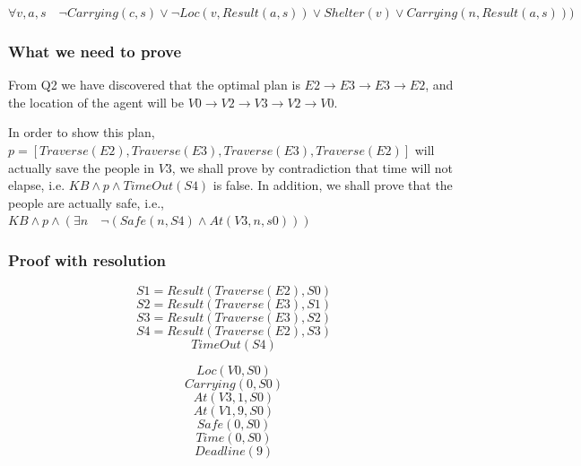 \documentclass{article}                     %
\begin{document}
	\begin{equation}\label{pick_unc}
	 \forall v, a, s \quad \neg Carrying(c, s) \lor \neg Loc(v, Result(a, s)) \lor Shelter(v) \lor Carrying(n, Result(a, s))) 
	\end{equation}
	
	

	
	
	
	
	\subsubsection{What we need to prove}
	From Q2 we have discovered that the optimal plan is $ E2 \rightarrow E3 \rightarrow E3 \rightarrow E2 $, and the location of the agent will be $ V0 \rightarrow V2 \rightarrow V3 \rightarrow V2 \rightarrow V0$.
	
	In order to show this plan, $ p=[Traverse(E2), Traverse(E3), Traverse(E3), Traverse(E2)] $ will actually save the people in $ V3 $, we shall prove by contradiction that time will not elapse, i.e. $ KB \land p \land TimeOut(S4) $ is false. In addition, we shall prove that the people are actually safe, i.e., $ KB \land p \land (\exists n \quad \neg(Safe(n, S4)\land At(V3, n, s0))) $
	
	\subsubsection{Proof with resolution}
\begin{equation}\label{res:s1}
	 S1 = Result(Traverse(E2), S0) 
\end{equation}
\begin{equation}\label{res:s2}
	 S2 = Result(Traverse(E3), S1) 
\end{equation}
\begin{equation}\label{res:s3}
	 S3 = Result(Traverse(E3), S2) 
\end{equation}
\begin{equation}\label{res:s4}
	 S4 = Result(Traverse(E2), S3) 
\end{equation}
\begin{equation}\label{res:Timeout}
	 TimeOut(S4) 
\end{equation}
	
\begin{equation}\label{res:l0}
	 Loc(V0, S0)  
\end{equation}
\begin{equation}\label{res:c0}
	 Carrying(0, S0)  
\end{equation}
\begin{equation}\label{res:at0}
	 At(V3, 1, S0)  
\end{equation}
\begin{equation}\label{key}
	 At(V1, 9, S0)   
\end{equation}
\begin{equation}\label{res:safe0}
	 Safe(0, S0)  
\end{equation}
\begin{equation}\label{res:t0}
	 Time(0, S0)  
\end{equation}
\begin{equation}\label{res:deadline}
Deadline(9)
\end{equation}
	
\end{document}
